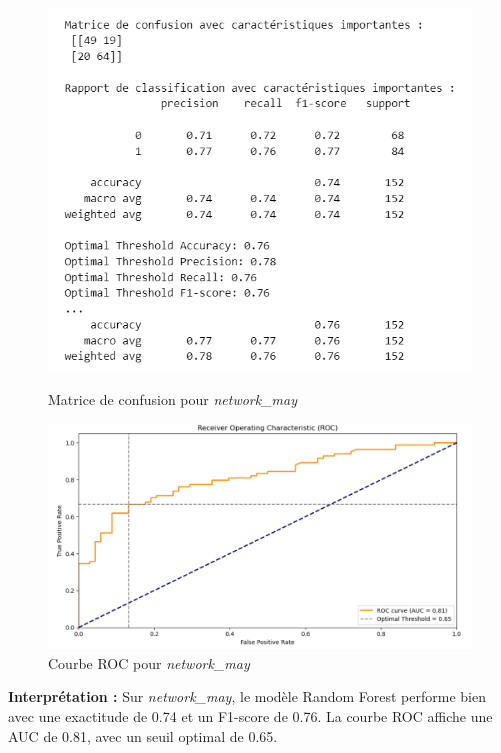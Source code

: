 \begin{figure}[H]
    \centering
    \begin{minipage}{0.45\linewidth}
        \centering
        \includegraphics[width=\linewidth]{capture_modele_11.png}
        \caption{Matrice de confusion pour \textit{network\_may}}
    \end{minipage}
    \hfill
    \begin{minipage}{0.45\linewidth}
        \centering
        \includegraphics[width=\linewidth]{capture_modele_40.png}
        \caption{Courbe ROC pour \textit{network\_may}}
        \label{fig:roc_may_rf}
    \end{minipage}
\end{figure}

\textbf{Interprétation :} Sur \textit{network\_may}, le modèle Random Forest performe bien avec une exactitude de 0.74 et un F1-score de 0.76. La courbe ROC affiche une AUC de 0.81, avec un seuil optimal de 0.65.

